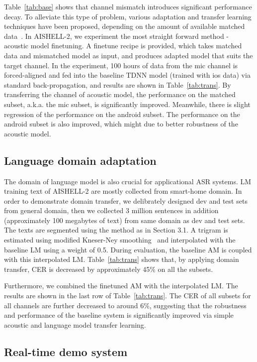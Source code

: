 \documentclass[a4paper]{article}
\begin{document}
Table~\ref{tab:base} shows that channel mismatch introduces significant
performance decay. To alleviate this type of problem, various adaptation and
transfer learning techniques have been proposed, depending on the amount of
available matched data~\cite{adapt}. In AISHELL-2, we experiment the most
straight forward method - acoustic model finetuning. A finetune recipe is
provided, which takes matched data and mismatched model as input, and produces
adapted model that suits the target channel. In the experiment, 100 hours of
data from the mic channel is forced-aligned and fed into the baseline TDNN model
(trained with ios data) via standard back-propagation, and results are shown in
Table~\ref{tab:trans}. By transferring the channel of acoustic model, the
performance on the matched subset, a.k.a. the mic subset, is significantly
improved. Meanwhile, there is slight regression of the performance on the
android subset. The performance on the android subset is also improved, which
might due to better robustness of the acoustic model.

\subsection{Language domain adaptation}

The domain of language model is also crucial for applicational ASR
systems. LM training text of AISHELL-2 are mostly collected from smart-home
domain. In order to demonstrate domain transfer, we delibrately designed dev and
test sets from general domain, then we collected 3 million sentences in addition
(approximately 100 megabytes of text) from same domain as dev and test sets. The
texts are segmented using the method as in Section 3.1. A trigram is estimated
using modified Kneser-Ney smoothing~\cite{kn} and interpolated with the
baseline LM using a weight of 0.5. During evaluation, the baseline AM is coupled
with this interpolated LM. Table~\ref{tab:trans} shows that, by applying domain
transfer, CER is decreased by approximately 45\% on all the subsets.

Furthermore, we combined the finetuned AM with the interpolated LM. The results
are shown in the last row of Table~\ref{tab:trans}. The CER of all subsets for
all channels are further decreased to around 6\%, suggesting that the robustness
and performance of the baseline system is significantly improved via simple
acoustic and language model transfer learning.


\subsection{Real-time demo system}
\end{document}

